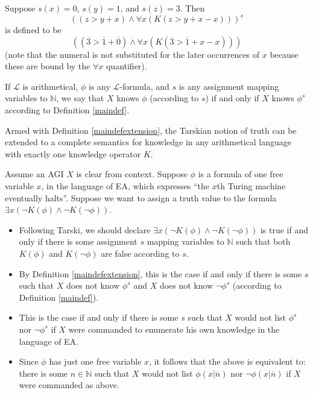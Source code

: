 \documentclass[runningheads]{llncs}
\begin{document}
\begin{example}
  Suppose $s(x)=0$, $s(y)=1$, and $s(z)=3$. Then
  \[
  ((z>y+x) \wedge \forall x(K(z>y+x-x)))^s
  \]
  is defined to be
  \[
  ((\overline 3 > \overline 1+\overline 0)
  \wedge \forall x( K( \overline 3 > \overline 1 + x - x ) ))
  \]
  (note that the numeral is not substituted for the later occurrences of $x$ because
  these are bound by the $\forall x$ quantifier).
\end{example}

\begin{definition}
\label{maindefextension}
  If $\mathscr L$ is arithmetical, $\phi$ is any $\mathscr L$-formula,
  and $s$ is any assignment mapping variables to $\mathbb N$,
  we say that $X$ knows $\phi$ (according to $s$) if and only if
  $X$ knows $\phi^s$ according to Definition \ref{maindef}.
\end{definition}

Armed with Definition \ref{maindefextension}, the Tarskian notion
\cite{sep-tarski-truth} of
truth can be extended to a complete semantics for
knowledge in any arithmetical language with exactly one knowledge operator $K$.

\begin{example}
  Assume an AGI $X$ is clear from context.
  Suppose $\phi$ is a formula of one free variable $x$, in the language of EA,
  which expresses ``the $x$th Turing machine eventually halts''. Suppose we want to
  assign a truth value to the formula $\exists x (\neg K(\phi)\wedge \neg K(\neg\phi))$.
  \begin{itemize}
  \item Following Tarski, we should declare $\exists x (\neg K(\phi)\wedge\neg K(\neg \phi))$
  is true if and only if there is some assignment $s$ mapping variables to $\mathbb N$
  such that both $K(\phi)$ and $K(\neg\phi)$ are false according to $s$.
  \item By Definition \ref{maindefextension}, this is the case if and only if
  there is some $s$ such that
  $X$ does not know $\phi^s$ and $X$ does not know $\neg\phi^s$
  (according to Definition \ref{maindef}).
  \item
  This is the case if and only if there is some $s$ such that $X$ would not
  list $\phi^s$ nor $\neg\phi^s$ if $X$ were commanded
  to enumerate his own knowledge in the language of EA.
  \item
  Since $\phi$ has just one free variable $x$, it follows that the above is equivalent to:
  there is some $n\in\mathbb N$ such that $X$ would not list $\phi(x|\overline n)$
  nor $\neg\phi(x|\overline n)$
  if $X$ were commanded as above.
  \end{itemize}
\end{example}
\end{document}
